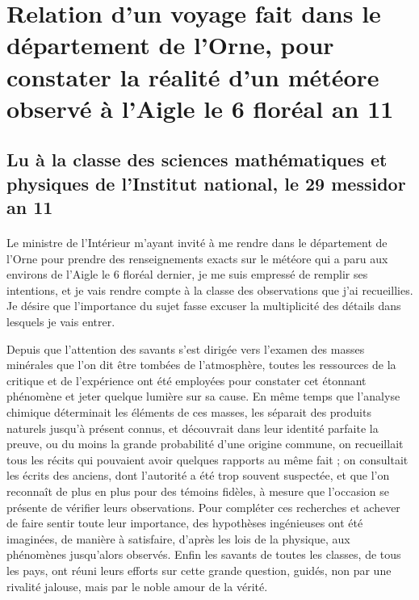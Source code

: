 \documentclass[a4paper, 11pt, oneside, polutonikogreek, french]{article}
\begin{document}
\section*{Relation d'un voyage fait dans le département de l'Orne, pour constater la réalité d'un météore observé à l'Aigle le 6 floréal an 11}
\subsection*{Lu à la classe des sciences mathématiques et physiques de l'Institut national, le 29 messidor an 11}
\paragraph{}
Le ministre de l'Intérieur m'ayant invité à me rendre dans le département de l'Orne pour prendre des renseignements exacts sur le météore qui a paru aux environs de l'Aigle le 6 floréal dernier, je me suis empressé de remplir ses intentions, et je vais rendre compte à la classe des observations que j'ai recueillies. Je désire que l'importance du sujet fasse excuser la multiplicité des détails dans lesquels je vais entrer.

Depuis que l'attention des savants s'est dirigée vers l'examen des masses minérales que l'on dit être tombées de l'atmosphère, toutes les ressources de la critique et de l'expérience ont été employées pour constater cet étonnant phénomène et jeter quelque lumière sur sa cause. En même temps que l'analyse chimique déterminait les éléments de ces masses, les séparait des produits naturels jusqu'à présent connus, et découvrait dans leur identité parfaite la preuve, ou du moins la grande probabilité d'une origine commune, on recueillait tous les récits qui pouvaient avoir quelques rapports au même fait ; on consultait les écrits des anciens, dont l'autorité a été trop souvent suspectée, et que l'on reconnaît de plus en plus pour des témoins fidèles, à mesure que l'occasion se présente de vérifier leurs observations. Pour compléter ces recherches et achever de faire sentir toute leur importance, des hypothèses ingénieuses ont été imaginées, de manière à satisfaire, d'après les lois de la physique, aux phénomènes jusqu'alors observés. Enfin les savants de toutes les classes, de tous les pays, ont réuni leurs efforts sur cette grande question, guidés, non par une rivalité jalouse, mais par le noble amour de la vérité.
\end{document}
